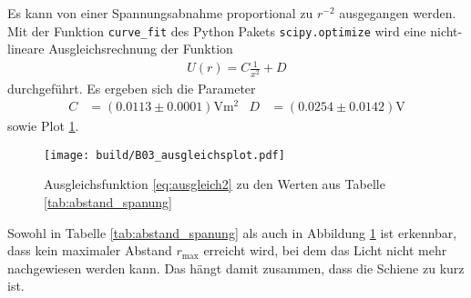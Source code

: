 \noindent
Es kann von einer Spannungsabnahme proportional zu $r^{-2}$ ausgegangen werden.
Mit der Funktion \texttt{curve\_fit} des Python \cite[]{python} Pakets \texttt{scipy.optimize} \cite[]{scipy} wird eine nicht-lineare Ausgleichsrechnung
der Funktion 
\begin{align}
    \label{eq:ausgleich2}
    U(r) = C \frac{1}{x^{2}} + D
\end{align}
durchgeführt.
Es ergeben sich die Parameter 
\begin{align*}
    C &= \left(\num[]{0.0113} \pm \num[]{0.0001}\right)\unit{\volt\meter\squared} & D &= \left(\num[]{0.0254} \pm \num[]{0.0142}\right)\unit{\volt} 
\end{align*}
sowie Plot \ref{fig:ausgleich3_plot}.
%
\begin{figure}
    \texttt{[image: build/B03\_ausgleichsplot.pdf]}
    \caption[]{Ausgleichsfunktion \eqref{eq:ausgleich2} zu den Werten aus Tabelle \ref{tab:abstand_spanung}}
    \label{fig:ausgleich3_plot}
\end{figure}

\noindent
Sowohl in Tabelle \ref{tab:abstand_spanung} als auch in Abbildung \ref{fig:ausgleich3_plot} ist erkennbar, 
dass kein maximaler Abstand $r_\text{max}$ erreicht wird, bei dem das Licht nicht mehr nachgewiesen werden kann.
Das hängt damit zusammen, dass die Schiene zu kurz ist.



